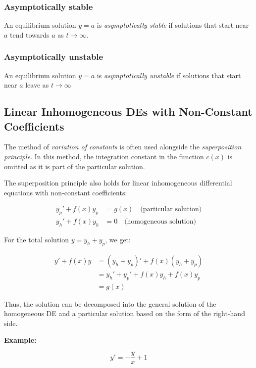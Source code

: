 \subsubsection*{Asymptotically stable}
An equilibrium solution \(y = a\) is \emph{asymptotically stable} if solutions
that start near \(a\) tend towards \(a\) as \(t \to \infty\).

\subsubsection*{Asymptotically unstable}
An equilibrium solution \(y = a\) is \emph{asymptotically unstable} if solutions
that start near \(a\) leave as \(t \to \infty\)


\subsection{Linear Inhomogeneous DEs with Non-Constant Coefficients}

The method of \emph{variation of constants} is often used alongside the \emph{superposition principle}. In this method, the integration constant in the function \( c(x) \) is omitted as it is part of the particular solution.
\vspace{\baselineskip}

The superposition principle also holds for linear inhomogeneous differential equations with non-constant coefficients:

\begin{align*}
y_p' + f(x)y_p &= g(x) \quad \text{(particular solution)} \\
y_h' + f(x)y_h &= 0 \quad \text{(homogeneous solution)}
\end{align*}

For the total solution \( y = y_h + y_p \), we get:

\begin{align*}
y' + f(x)y 
&= (y_h + y_p)' + f(x)(y_h + y_p) \\
&= y_h' + y_p' + f(x)y_h + f(x)y_p \\
&= g(x)
\end{align*}

Thus, the solution can be decomposed into the general solution of the homogeneous DE and a particular solution based on the form of the right-hand side.
\vspace{\baselineskip}

\textbf{Example: }

\[y' = -\frac{y}{x} + 1\]

